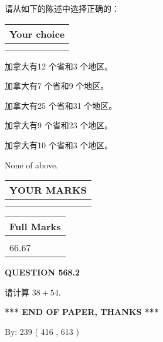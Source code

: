\documentclass{ctexart}
\begin{document}
  
请从如下的陈述中选择正确的：
  
  
\noindent\hspace{3.0in} \begin{tabular}{|l|}
\hline
Your choice \\
\hline
 \\ 
 \\ 
\hline
\end{tabular}
  
  
 
 
加拿大有12 个省和3 个地区。
 
 
加拿大有7 个省和9 个地区。
 
 
加拿大有25 个省和31 个地区。
 
 
加拿大有9 个省和23 个地区。
 
 
加拿大有10 个省和3 个地区。
 
 
 None of above.
 
 
  
\vspace{0.2in}
  
\noindent\begin{tabular}{|l|}
\hline
 YOUR MARKS  \\
\hline
 \\ 
 \\ 
\hline
\end{tabular}
\hspace{0.05in} \begin{tabular}{|l|}
\hline
 Full Marks  \\
\hline
 \\ 
66.67 \\
\hline
\end{tabular}
{\textbf{\Large{QUESTION
568.2 
}}}
  
  
 
请计算 $ %
38 +  %
54 $.
 

 

 
   
   
 \vspace{0.2in}
 
   
   
   
   
\vspace{1.0in} 
{\textbf{\large{ *** END OF PAPER, THANKS *** }}} 
   
   
\hspace{1.0in} By: 
 239 ( 416 ,  613 )
   
\end{document}
